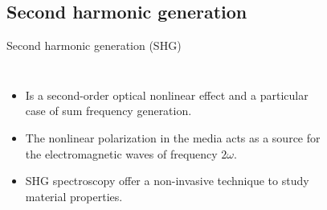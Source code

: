 \documentclass{beamer}
\begin{document}



\subsection{Second harmonic generation}


\begin{frame}

\vspace{-0.2cm}

\noindent\makebox[\linewidth]{\rule{\linewidth}{0.4pt}}

\vspace{-2.0mm}
\begin{center}
{\large Second harmonic generation (SHG)}
\end{center}

\vspace{-6mm}
\noindent\makebox[\linewidth]{\rule{\linewidth}{0.4pt}}



\begin{columns}


{\small


\begin{itemize}

\item 
Is a second-order optical nonlinear effect and a particular case of sum
frequency generation.

\item 
The nonlinear polarization in the media acts as a source for the
electromagnetic waves of frequency $2\omega$.

\item 
SHG spectroscopy offer a non-invasive technique to study material properties.

\end{itemize}
}


\begin{figure}[h!]
\begin{tikzpicture}


\end{tikzpicture}
\end{figure}
\end{columns}
\end{frame}
\end{document}
